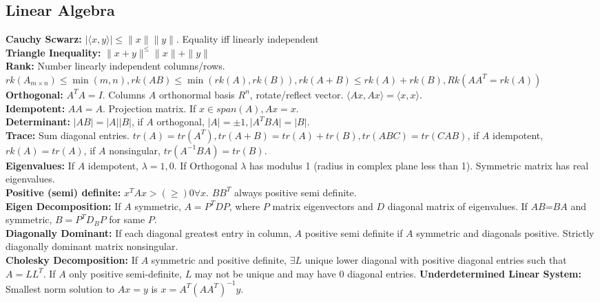 \documentclass[10pt]{article}
\theoremstyle{definition}
\begin{document}
\begin{multicols}{2}
\subsection{Linear Algebra}
{\bf Cauchy Scwarz:} \(\vert\langle x,y \rangle \vert \leq \|x\|\|y\|\). Equality iff linearly independent \\
{\bf Triangle Inequality:} \(\|x+y\|^\leq\|x\|+\|y\|\) \\
{\bf Rank:} Number linearly independent columns/rows. \(rk(A_{m\times n})\leq \min(m,n), rk(AB)\leq \min(rk(A),rk(B)), rk(A+B)\leq rk(A) + rk(B), Rk(AA^T=rk(A))\) \\
{\bf Orthogonal:} $A^TA=I$. Columns $A$ orthonormal basis $R^n$, rotate/reflect vector. \(\langle Ax,Ax\rangle = \langle x, x \rangle\). \\
{\bf Idempotent:} \(AA=A\). Projection matrix. If \(x\in span(A), Ax=x\). \\
{\bf Determinant:} \(\vert AB \vert = \vert A\vert \vert B \vert\), if $A$ orthogonal, \(\vert A\vert = \pm 1, \vert A^TBA\vert = \vert B\vert. \) \\
{\bf Trace:} Sum diagonal entries. \(tr(A)=tr(A^T), tr(A+B)=tr(A)+tr(B), tr(ABC)=tr(CAB)\), if $A$ idempotent, \(rk(A)=tr(A)\), if $A$ nonsingular, \(tr(A^{-1}BA)=tr(B)\). \\
{\bf Eigenvalues:} If $A$ idempotent, \(\lambda =1,0\). If Orthogonal $\lambda$ has modulus 1 (radius in complex plane less than 1). Symmetric matrix has real eigenvalues. \\
{\bf Positive (semi) definite:} \(x^TAx > (\geq) 0 \forall x\). $BB^T$ always positive semi definite. \\
{\bf Eigen Decomposition:} If $A$ symmetric, \(A=P^TDP\), where $P$ matrix eigenvectors and $D$ diagonal matrix of eigenvalues. If $AB$=$BA$ and symmetric, $B=P^TD_BP$ for same $P$. \\
{\bf Diagonally Dominant:} If each diagonal greatest entry in column, $A$ positive semi definite if $A$ symmetric and diagonals positive. Strictly diagonally dominant matrix nonsingular. \\
{\bf Cholesky Decomposition:} If $A$ symmetric and positive definite, \(\exists L\) unique lower diagonal with positive diagonal entries such that $A=LL^T$. If $A$ only positive semi-definite, $L$ may not be unique and may have $0$ diagonal entries.
{\bf Underdetermined Linear System:} Smallest norm solution to $Ax=y$ is \(x=A^T(AA^T)^{-1}y\).
\end{multicols}
\end{document}

